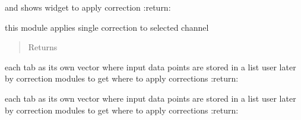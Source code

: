 \documentclass[letterpaper,10pt,english]{sphinxmanual}
\begin{document}
\begin{fulllineitems}
\begin{fulllineitems}
and shows widget to apply correction
:return:

\end{fulllineitems}


\begin{fulllineitems}
\label{Cormat_main:Cormat_main.CORMAT_GUI.gettotalcorrections}
\end{fulllineitems}


\begin{fulllineitems}
\label{Cormat_main:Cormat_main.CORMAT_GUI.singlecorrection}
this module applies single correction to selected channel
\begin{quote}\begin{description}
\item[{Returns}] \leavevmode


\end{description}\end{quote}

\end{fulllineitems}


\begin{fulllineitems}
\label{Cormat_main:Cormat_main.CORMAT_GUI.get_point}
each tab as its own vector where input data points are stored in a list
user later by correction modules to get where to apply corrections
:return:

\end{fulllineitems}


\begin{fulllineitems}
\label{Cormat_main:Cormat_main.CORMAT_GUI.get_multiple_points}
each tab as its own vector where input data points are stored in a list
user later by correction modules to get where to apply corrections
:return:

\end{fulllineitems}



\end{fulllineitems}
\end{document}
